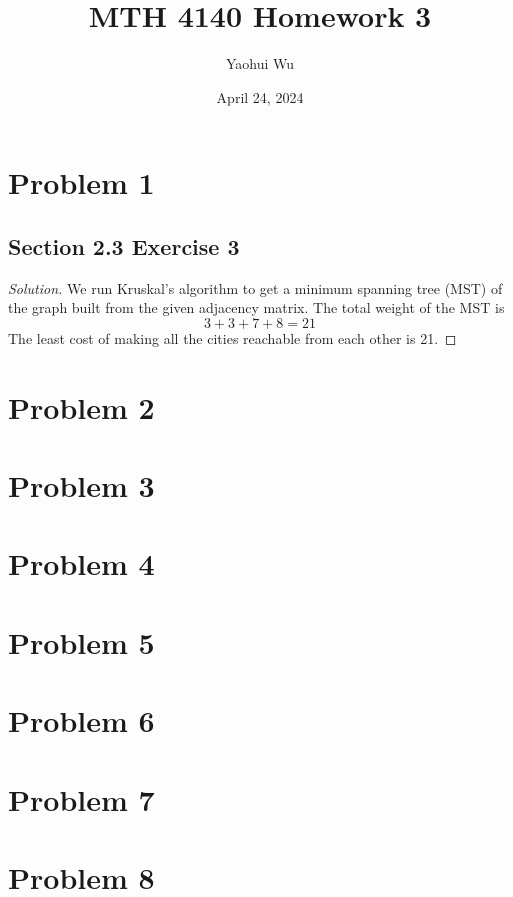 \documentclass[12pt]{article}
\title{MTH 4140 Homework 3}
\author{Yaohui Wu}
\date{April 24, 2024}
\newenvironment*{solution}{\begin{proof}[Solution]}{\end{proof}}
\begin{document}
\maketitle
\section*{Problem 1}
\subsection*{Section 2.3 Exercise 3}
\begin{solution}
    We run Kruskal's algorithm to get a minimum spanning tree (MST) of the
    graph built from the given adjacency matrix. The total weight of the MST
    is \[3+3+7+8=21\] The least cost of making all the cities reachable from
    each other is 21.
\end{solution}
\section*{Problem 2}
\section*{Problem 3}
\section*{Problem 4}
\section*{Problem 5}
\section*{Problem 6}
\section*{Problem 7}
\section*{Problem 8}
\end{document}
